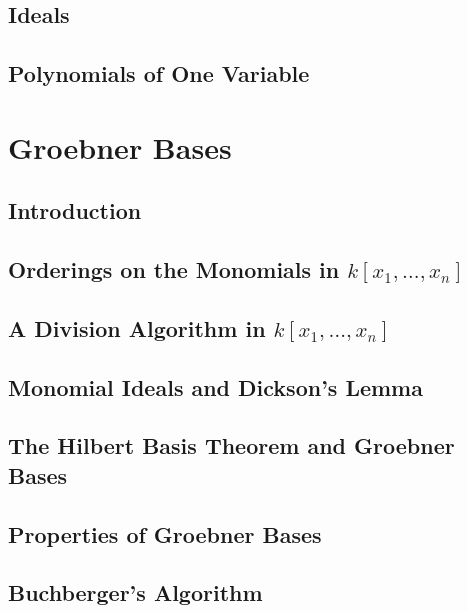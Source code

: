 \documentclass[10pt]{amsart}
\begin{document}
\begin{multicols*}{2}
\subsection{Ideals}



\subsection{Polynomials of One Variable}




\section{Groebner Bases}

\subsection{Introduction}




\subsection{Orderings on the Monomials in $k[x_1, \dots , x_n]$ }




\subsection{A Division Algorithm in $k[x_1, \dots , x_n ]$ }



\subsection{Monomial Ideals and Dickson's Lemma }


\subsection{The Hilbert Basis Theorem and Groebner Bases}


\subsection{Properties of Groebner Bases}



\subsection{Buchberger's Algorithm}







\end{multicols*}
\end{document}
